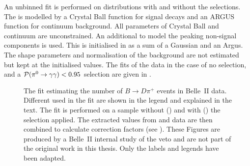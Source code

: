 An unbinned \Mbc fit is performed on distributions with and without the \piVeto selections.
The \Mbc is modelled by a Crystal Ball function for signal decays and an ARGUS function for continuum background.
All parameters of Crystal Ball and continuum are unconstrained.
An additional \PDF to model the peaking non-signal \BB components is used.
This \PDF is initialised in \MC as a sum of a Gaussian and an Argus.
The shape parameters and normalisation of the \BB background \PDF are not estimated but kept at the initialised values.
The fits of the data in the case of no \piVeto selection, and a ${\mathcal{P}(\pi^0\rightarrow\gamma\gamma)}<0.95$ selection are given in .
\begin{figure}[hbtp!]
    \centering
    \caption{\label{fig:pivetofit} The fit estimating the number of $B\to D \pi^+$ events in Belle~II data.
    Different  used in the fit are shown in the legend and explained in the text.
    The fit is performed on a sample without () and with () the \piVeto selection applied.
    The extracted values from \MC and data are then combined to calculate \piVeto correction factors (see ).
    These Figures are produced by a Belle~II internal study of the \piz veto and are not part of the original work in this thesis.
    Only the labels and legends have been adapted.    
    }
\end{figure}

